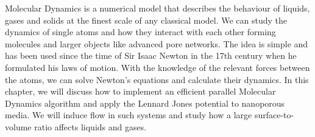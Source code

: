 Molecular Dynamics is a numerical model that describes the behaviour of liquids, gases and solids at the finest scale of any classical model. We can study the dynamics of single atoms and how they interact with each other forming molecules and larger objects like advanced pore networks. The idea is simple and has been used since the time of Sir Isaac Newton in the 17th century when he formulated his laws of motion. With the knowledge of the relevant forces between the atoms, we can solve Newton's equations and calculate their dynamics. In this chapter, we will discuss how to implement an efficient parallel Molecular Dynamics algorithm and apply the Lennard Jones potential to nanoporous media. We will induce flow in such systems and study how a large surface-to-volume ratio affects liquids and gases. 